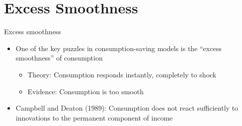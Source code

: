 \documentclass[10pt,english,t,10pt]{beamer}
\newcommand{\jbemph}[1]{\textbf{\color{SlideNavy}#1}}
\begin{document}
\section{Excess Smoothness}
\begin{frame}{Excess smoothness}

	\begin{itemize}       
		
		\item  One of the key puzzles in consumption-saving models is the ``excess smoothness'' of consumption
	
	\begin{itemize}       
		
		\item  Theory:  Consumption responds instantly, completely to shock           
		

		
		\item Evidence: Consumption is too smooth 
	
	\end{itemize}     

\pause

		\item Campbell and Deaton (1989): Consumption does not react sufficiently to innovations to the permanent component of income
	
	\end{itemize}     

\end{frame}
\end{document}
